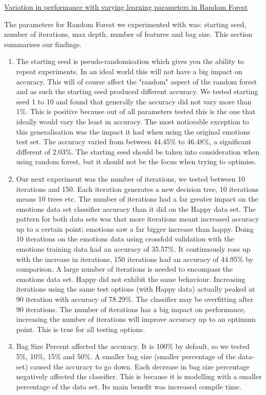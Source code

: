 \raggedright\underline{Variation in performance with varying learning parameters in Random Forest}

The parameters for Random Forest we experimented with was: starting seed, number of iterations, max depth, number of features and bag size. This section summarises our findings.
\begin{enumerate}
    \item The starting seed is pseudo-randomisation which gives you the ability to repeat experiments. In an ideal world this will not have a big impact on accuracy. This will of course affect the "random" aspect of the random forest and as such the starting seed produced different accuracy. We tested starting seed 1 to 10 and found that generally the accuracy did not vary more than 1\%. This is positive because out of all parameters tested this is the one that ideally would vary the least in accuracy. The most noticeable exception to this generalisation was the impact it had when using the original emotions test set. The accuracy varied from between 44.45\% to 46.48\%, a significant different of 2.03\%. The starting seed should be taken into consideration when using random forest, but it should not be the focus when trying to optimise.
    \item Our next experiment was the number of iterations, we tested between 10 iterations and 150. Each iteration generates a new decision tree, 10 iterations means 10 trees etc. The number of iterations had a far greater impact on the emotions data set classifier accuracy than it did on the Happy data set. The pattern for both data sets was that more iterations meant increased accuracy up to a certain point; emotions saw a far bigger increase than happy. Doing 10 iterations on the emotions data using crossfold validation with the emotions training data had an accuracy of 35.57\%. It continuously rose up with the increase in iterations, 150 iterations had an accuracy of 44.95\% by comparison. A large number of iterations is needed to encompass the emotions data set. Happy did not exhibit the same behaviour. Increasing iterations using the same test options (with Happy data) actually peaked at 90 iteration with accuracy of 78.29\%. The classifier may be overfitting after 90 iterations. The number of iterations has a big impact on performance, increasing the number of iterations will improve accuracy up to an optimum point. This is true for all testing options. 
    \item Bag Size Percent affected the accuracy. It is 100\% by default, so we tested 5\%, 10\%, 15\% and 50\%. A smaller bag size (smaller percentage of the data-set) caused the accuracy to go down. Each decrease in bag size percentage negatively affected the classifier. This is because it is modelling with a smaller percentage of the data set. Its main benefit was increased compile time. 

\end{enumerate}
